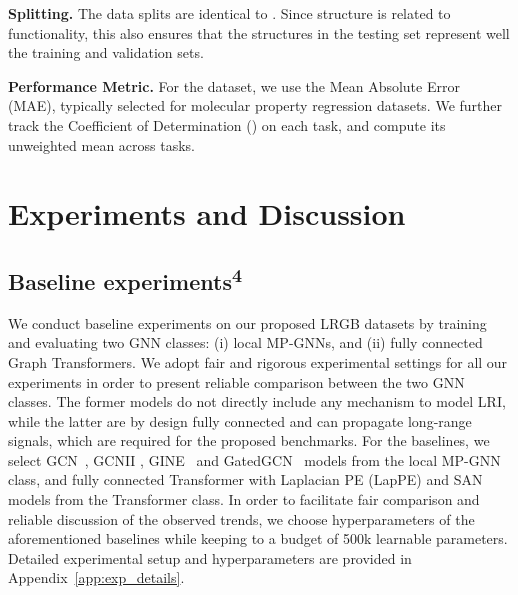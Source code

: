 \documentclass{article}
\begin{document}
\textbf{Splitting.}
The data splits are identical to \pepfunc. Since structure is related to functionality, this also ensures that the structures in the testing set represent well the training and validation sets.


\textbf{Performance Metric.}
For the \pepstruct dataset, we use the Mean Absolute Error (MAE), typically selected for molecular property regression datasets. We further track the Coefficient of Determination () on each task, and compute its unweighted mean across tasks.





\section{Experiments and Discussion}


\subsection{Baseline experiments\textsuperscript{4}}
We conduct baseline experiments on our proposed LRGB datasets by training and evaluating two GNN classes: (i) local MP-GNNs, and (ii) fully connected Graph Transformers. We adopt fair and rigorous experimental settings for all our experiments in order to present reliable comparison between the two GNN classes. The former models do not directly include any mechanism to model LRI, while the latter are by design fully connected and can propagate long-range signals, which are required for the proposed benchmarks. For the baselines, we select GCN~\cite{kipf2016gcn}, GCNII \cite{chen2020GCNII}, GINE~\cite{xu2018powerful_gin, hu2019strategies} and GatedGCN~\cite{bresson2017gatedGCN} models from the local MP-GNN class, and fully connected Transformer \cite{vaswani_2017_attention} with Laplacian PE (LapPE) \cite{dwivedi2020benchmarking, dwivedi2020generalization} and SAN \cite{kreuzer2021rethinking} models from the Transformer class. In order to facilitate fair comparison and reliable discussion of the observed trends, we choose hyperparameters of the aforementioned baselines while keeping to a budget of 500k learnable parameters. Detailed experimental setup and hyperparameters are provided in Appendix~\ref{app:exp_details}.
\end{document}
